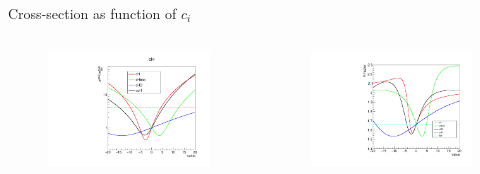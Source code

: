 \begin{frame}{Cross-section as function of $c_{i}$}
\begin{columns}
\begin{figure}
    \centering
    \includegraphics[width=1.\textwidth]{BackUp/Part5/Img/Xsec_NLO_with_SM.pdf}
\end{figure}
\begin{figure}
    \centering
    \includegraphics[width=1.\textwidth]{BackUp/Part5/Img/k_factor_with_SM.pdf}
\end{figure}
\end{columns}
\end{frame}

